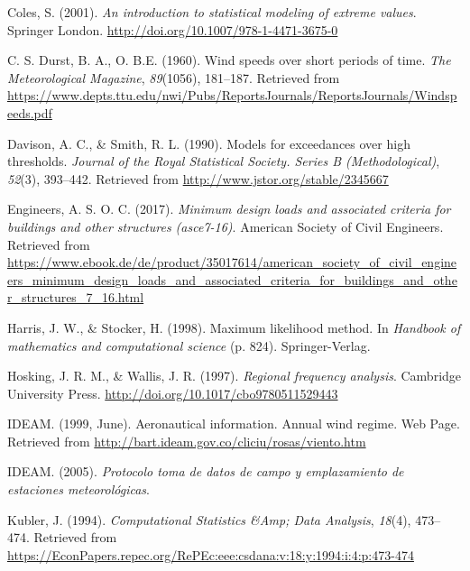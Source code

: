 \documentclass[12pt,oneside]{reedthesis}
\begin{document}
\noindent

\setlength{\parindent}{-0.20in}
\setlength{\leftskip}{0.20in}
\setlength{\parskip}{8pt}

\hypertarget{refs}{}
\leavevmode\hypertarget{ref-Coles2001}{}%
Coles, S. (2001). \emph{An introduction to statistical modeling of extreme values}. Springer London. \url{http://doi.org/10.1007/978-1-4471-3675-0}

\leavevmode\hypertarget{ref-Durst1960}{}%
C. S. Durst, B. A., O. B.E. (1960). Wind speeds over short periods of time. \emph{The Meteorological Magazine}, \emph{89}(1056), 181--187. Retrieved from \url{https://www.depts.ttu.edu/nwi/Pubs/ReportsJournals/ReportsJournals/Windspeeds.pdf}

\leavevmode\hypertarget{ref-Davison1990}{}%
Davison, A. C., \& Smith, R. L. (1990). Models for exceedances over high thresholds. \emph{Journal of the Royal Statistical Society. Series B (Methodological)}, \emph{52}(3), 393--442. Retrieved from \url{http://www.jstor.org/stable/2345667}

\leavevmode\hypertarget{ref-Asce2017}{}%
Engineers, A. S. O. C. (2017). \emph{Minimum design loads and associated criteria for buildings and other structures (asce7-16)}. American Society of Civil Engineers. Retrieved from \url{https://www.ebook.de/de/product/35017614/american_society_of_civil_engineers_minimum_design_loads_and_associated_criteria_for_buildings_and_other_structures_7_16.html}

\leavevmode\hypertarget{ref-Harris1994}{}%
Harris, J. W., \& Stocker, H. (1998). Maximum likelihood method. In \emph{Handbook of mathematics and computational science} (p. 824). Springer-Verlag.

\leavevmode\hypertarget{ref-Hosking1997}{}%
Hosking, J. R. M., \& Wallis, J. R. (1997). \emph{Regional frequency analysis}. Cambridge University Press. \url{http://doi.org/10.1017/cbo9780511529443}

\leavevmode\hypertarget{ref-ideam1999}{}%
IDEAM. (1999, June). Aeronautical information. Annual wind regime. Web Page. Retrieved from \url{http://bart.ideam.gov.co/cliciu/rosas/viento.htm}

\leavevmode\hypertarget{ref-ideam2005}{}%
IDEAM. (2005). \emph{Protocolo toma de datos de campo y emplazamiento de estaciones meteorológicas}.

\leavevmode\hypertarget{ref-Kubler1994}{}%
Kubler, J. (1994). \emph{Computational Statistics \&Amp; Data Analysis}, \emph{18}(4), 473--474. Retrieved from \url{https://EconPapers.repec.org/RePEc:eee:csdana:v:18:y:1994:i:4:p:473-474}
\end{document}
